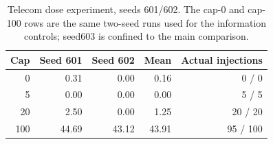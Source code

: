 \begin{table}[t]
\centering
\caption{Telecom dose experiment, seeds 601/602. The cap-0 and cap-100 rows are the same two-seed runs used for the information controls; seed603 is confined to the main comparison.}
\label{tab:injection-dose}
\begin{tabular}{@{}rrrrr@{}}
\toprule
Cap & Seed 601 & Seed 602 & Mean & Actual injections \\
\midrule
0 & 0.31 & 0.00 & 0.16 & 0 / 0 \\
5 & 0.00 & 0.00 & 0.00 & 5 / 5 \\
20 & 2.50 & 0.00 & 1.25 & 20 / 20 \\
100 & 44.69 & 43.12 & 43.91 & 95 / 100 \\
\bottomrule
\end{tabular}
\end{table}
